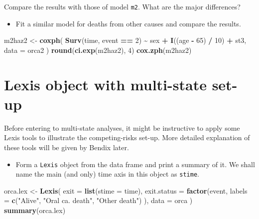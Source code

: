 \documentclass[
]{book}
\newenvironment{Shaded}{\begin{snugshade}}{\end{snugshade}}
\newcommand{\AttributeTok}[1]{\textcolor[rgb]{0.13,0.29,0.53}{#1}}
\newcommand{\DecValTok}[1]{\textcolor[rgb]{0.00,0.00,0.81}{#1}}
\newcommand{\FunctionTok}[1]{\textcolor[rgb]{0.13,0.29,0.53}{\textbf{#1}}}
\newcommand{\NormalTok}[1]{#1}
\newcommand{\OtherTok}[1]{\textcolor[rgb]{0.56,0.35,0.01}{#1}}
\newcommand{\SpecialCharTok}[1]{\textcolor[rgb]{0.81,0.36,0.00}{\textbf{#1}}}
\newcommand{\StringTok}[1]{\textcolor[rgb]{0.31,0.60,0.02}{#1}}
\providecommand{\tightlist}{%
  \setlength{\itemsep}{0pt}\setlength{\parskip}{0pt}}
\begin{document}
Compare the results with those of model \texttt{m2}. What are the major differences?

\begin{itemize}
\tightlist
\item
  Fit a similar model for deaths from other causes and compare the results.
\end{itemize}

\begin{Shaded}
\begin{Highlighting}[]
\NormalTok{m2haz2 }\OtherTok{\textless{}{-}} 
  \FunctionTok{coxph}\NormalTok{(}
    \FunctionTok{Surv}\NormalTok{(time, event }\SpecialCharTok{==} \DecValTok{2}\NormalTok{) }\SpecialCharTok{\textasciitilde{}}\NormalTok{ sex }\SpecialCharTok{+} \FunctionTok{I}\NormalTok{((age }\SpecialCharTok{{-}} \DecValTok{65}\NormalTok{) }\SpecialCharTok{/} \DecValTok{10}\NormalTok{) }\SpecialCharTok{+}\NormalTok{ st3, }
    \AttributeTok{data =}\NormalTok{ orca2}
\NormalTok{  )}
\FunctionTok{round}\NormalTok{(}\FunctionTok{ci.exp}\NormalTok{(m2haz2), }\DecValTok{4}\NormalTok{)}
\FunctionTok{cox.zph}\NormalTok{(m2haz2)}
\end{Highlighting}
\end{Shaded}

\section{Lexis object with multi-state set-up}\label{lexis-object-with-multi-state-set-up}

Before entering to multi-state analyses, it might be instructive to apply some Lexis tools to illustrate the competing-risks set-up.
More detailed explanation of these tools will be given by Bendix later.

\begin{itemize}
\tightlist
\item
  Form a \texttt{Lexis} object from the data frame and
  print a summary of it. We shall name the main (and only) time axis
  in this object as \texttt{stime}.
\end{itemize}

\begin{Shaded}
\begin{Highlighting}[]
\NormalTok{orca.lex }\OtherTok{\textless{}{-}} \FunctionTok{Lexis}\NormalTok{(}
  \AttributeTok{exit =} \FunctionTok{list}\NormalTok{(}\AttributeTok{stime =}\NormalTok{ time),}
  \AttributeTok{exit.status =} \FunctionTok{factor}\NormalTok{(event,}
    \AttributeTok{labels =} \FunctionTok{c}\NormalTok{(}\StringTok{"Alive"}\NormalTok{, }\StringTok{"Oral ca. death"}\NormalTok{, }\StringTok{"Other death"}\NormalTok{)}
\NormalTok{  ),}
  \AttributeTok{data =}\NormalTok{ orca}
\NormalTok{)}
\FunctionTok{summary}\NormalTok{(orca.lex)}
\end{Highlighting}
\end{Shaded}
\end{document}
